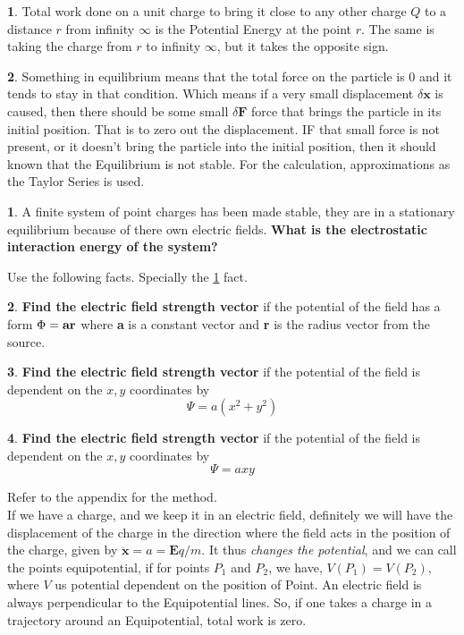 \documentclass[11pt,a4paper,twocolumn,openright]{article}
\renewcommand{\vec}[1]{\boldsymbol{#1}}
\theoremstyle{definition}
\newtheorem{fct}{ \framebox[0.05\textwidth]{{\sffamily Fact}} }
\theoremstyle{definition}
\newtheorem{pr}{ \framebox[0.05\textwidth]{{\sffamily Pr}} }
\theoremstyle{definition}
\theoremstyle{definition}
\begin{document}
 
\begin{fct} \label{potsdist}
Total work done on a unit charge to bring it close to any other charge $Q$ to a distance $r$ from infinity $\infty$ is the Potential Energy at the point $r$. The same is taking the charge from $r$ to infinity $\infty$, but it takes the opposite sign. \end{fct}
\begin{fct} \label{equilibrium}
Something in equilibrium means that the total force on the particle is 0 and it tends to stay in that condition. Which means if a very small displacement $\delta \vec{x}$ is caused, then there should be some small $\delta \vec{F}$ force that brings the particle in its initial position. That is to zero out the displacement. IF that small force is not present, or it doesn't bring the particle into the initial position, then it should known that the Equilibrium is not stable. For the calculation, approximations as the Taylor Series is used. 
\end{fct}
%
%
 \begin{pr}
 A finite system of point charges has been made stable, they are in a stationary equilibrium because of there own electric fields. \textbf{What is the electrostatic interaction energy of the system?}
 \end{pr}
Use the following facts. Specially the \ref{potsdist} fact.
%
%
\begin{pr} \label{pr5}
\textbf{Find the electric field strength vector} if the potential of the field has a form $\Phi = \text{\textbf{ar}}$ where \textbf{a} is a constant vector and \textbf{r} is the radius vector from the source.
\end{pr}
%
%
\begin{pr} \label{pr6}
\textbf{Find the electric field strength vector} if the potential of the field is dependent on the $x,y$ coordinates by 
\[ \Psi = a (x^2 + y^2) \]
\end{pr}
%
\begin{pr} \label{pr7}
\textbf{Find the electric field strength vector} if the potential of the field is dependent on the $x,y$ coordinates by 
\[ \Psi = axy \]
\end{pr}
%
Refer to the appendix for the method.\\
If we have a charge, and we keep it in an electric field, definitely we will have the displacement of the charge in the direction where the field acts in the position of the charge, given by $\vec{\ddot{x}} = a = \vec{E}q/m$. It thus \emph{changes the potential}, and we can call the points equipotential, if for points $P_1$ and $P_2$, we have, $V(P_1) = V(P_2)$, where $V$ us potential dependent on the position of Point. An electric field is always perpendicular to the Equipotential lines. So, if one takes a charge in a trajectory around an Equipotential, total work is zero.
\end{document}
